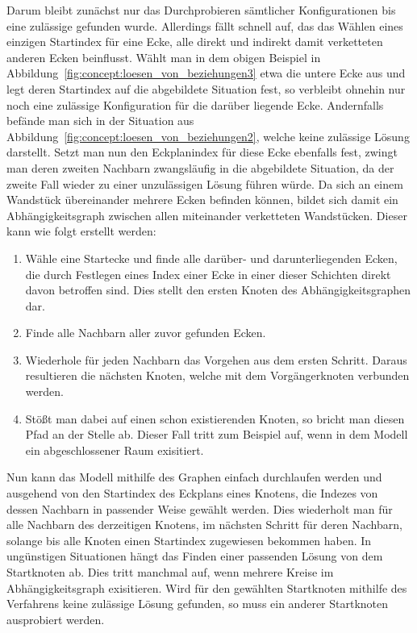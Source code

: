 Darum bleibt zunächst nur das Durchprobieren sämtlicher Konfigurationen bis eine zulässige gefunden wurde.
Allerdings fällt schnell auf, das das Wählen eines einzigen Startindex für eine Ecke, alle direkt und indirekt damit verketteten anderen Ecken beinflusst.
Wählt man in dem obigen Beispiel in Abbildung~\ref{fig:concept:loesen_von_beziehungen3} etwa die untere Ecke aus und legt deren Startindex auf die abgebildete Situation fest, so verbleibt ohnehin nur noch eine zulässige Konfiguration für die darüber liegende Ecke.
Andernfalls befände man sich in der Situation aus Abbildung~\ref{fig:concept:loesen_von_beziehungen2}, welche keine zulässige Lösung darstellt.
Setzt man nun den Eckplanindex für diese Ecke ebenfalls fest, zwingt man deren zweiten Nachbarn zwangsläufig in die abgebildete Situation, da der zweite Fall wieder zu einer unzulässigen Lösung führen würde.
Da sich an einem Wandstück übereinander mehrere Ecken befinden können, bildet sich damit ein Abhängigkeitsgraph zwischen allen miteinander verketteten Wandstücken.
Dieser kann wie folgt erstellt werden:

\begin{enumerate}
    \item Wähle eine Startecke und finde alle darüber- und darunterliegenden Ecken, die durch Festlegen eines Index einer Ecke in einer dieser Schichten direkt davon betroffen sind. Dies stellt den ersten Knoten des Abhängigkeitsgraphen dar.
    \item Finde alle Nachbarn aller zuvor gefunden Ecken.
    \item Wiederhole für jeden Nachbarn das Vorgehen aus dem ersten Schritt. Daraus resultieren die nächsten Knoten, welche mit dem Vorgängerknoten verbunden werden.
    \item Stößt man dabei auf einen schon existierenden Knoten, so bricht man diesen Pfad an der Stelle ab. Dieser Fall tritt zum Beispiel auf, wenn in dem Modell ein abgeschlossener Raum exisitiert.
\end{enumerate}

Nun kann das Modell mithilfe des Graphen einfach durchlaufen werden und ausgehend von den Startindex des Eckplans eines Knotens, die Indezes von dessen Nachbarn in passender Weise gewählt werden.
Dies wiederholt man für alle Nachbarn des derzeitigen Knotens, im nächsten Schritt für deren Nachbarn, solange bis alle Knoten einen Startindex zugewiesen bekommen haben.
In ungünstigen Situationen hängt das Finden einer passenden Lösung von dem Startknoten ab.
Dies tritt manchmal auf, wenn mehrere Kreise im Abhängigkeitsgraph exisitieren.
Wird für den gewählten Startknoten mithilfe des Verfahrens keine zulässige Lösung gefunden, so muss ein anderer Startknoten ausprobiert werden.

